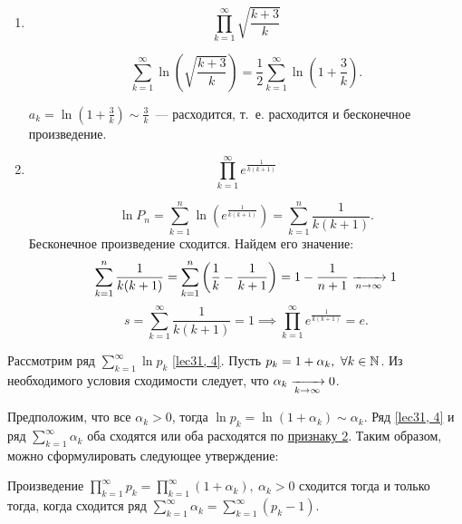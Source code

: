 \documentclass[../../main.tex]{subfiles}
\begin{document}
	\begin{example}
		\begin{enumerate}[label=\arabic*)]
			\item \[\prod\limits_{k = 1}^{\infty} \sqrt{\frac{k + 3}{k}}\]
			
			\[\sum\limits_{k = 1}^{\infty} \ln \left(\sqrt{\frac{k + 3}{k}}\right) = 
			\frac{1}{2} 
			\sum\limits_{k = 1}^{\infty} \ln\left(1 + \frac{3}{k}\right). \]
			
			$\displaystyle a_k = \ln \left(1 + \frac{3}{k}\right) \sim \frac{3}{k}$~--- 
			расходится, 
			т.~е. расходится и бесконечное произведение.
			
			\item \[\prod\limits_{k = 1}^{\infty} e^{\frac{1}{k(k + 1)}} \]
			
			\[\ln P_n = \sum\limits_{k = 1}^{n} \ln \left(e^{\frac{1}{k(k + 1)}}\right) 
			= \sum\limits_{k = 1}^{n} \frac{1}{k(k + 1)}.\]
			Бесконечное произведение сходится. Найдем его значение:
			\[\sum\limits_{k = 1}^{n} \frac{1}{k(k + 1)} = \sum\limits_{k = 1}^{n} 
			\left(\frac{1}{k} - \frac{1}{k + 1} \right) = 1 - \frac{1}{n + 1} \xrightarrow[n 
			\to \infty]{} 1 \]
			\[s = \sum\limits_{k = 1}^{\infty} \frac{1}{k(k + 1)} = 1 \implies 
			\prod\limits_{k = 1}^{\infty} e^{\frac{1}{k(k + 1)}} = e.\]
		\end{enumerate}
	\end{example}

	Рассмотрим ряд $\sum\limits_{k = 1}^{\infty} \ln p_k$ \eqref{lec31, 4}. Пусть 
	$p_k = 1 + \alpha_k,\ \forall k\in\mathbb{N}$. Из необходимого условия сходимости 
	следует, 
	что $\alpha_k \xrightarrow[k \to \infty]{} 0$.
	
	Предположим, что все $\alpha_k > 0$, 
	тогда ${\ln p_k = \ln (1 + \alpha_k) \sim \alpha_k}$.
	Ряд \eqref{lec31, 4} и ряд $\sum\limits_{k = 1}^{\infty} \alpha_k$ оба 
	сходятся или оба расходятся по \hyperref[lec26:comp_test_2]{признаку 
	2\textdegree}. Таким образом, можно сформулировать
	следующее утверждение:
	
	\begin{thm}\label{lec31:thm2} 
		Произведение $\prod\limits_{k = 1}^{\infty} p_k = \prod\limits_{k = 
		1}^{\infty}(1 + \alpha_k),\ \alpha_k > 0$ сходится тогда и только тогда, 
		когда сходится ряд $\sum\limits_{k = 1}^{\infty} \alpha_k = \sum\limits_{k = 
		1}^{\infty} (p_k - 1)$.
	\end{thm}
\end{document}
